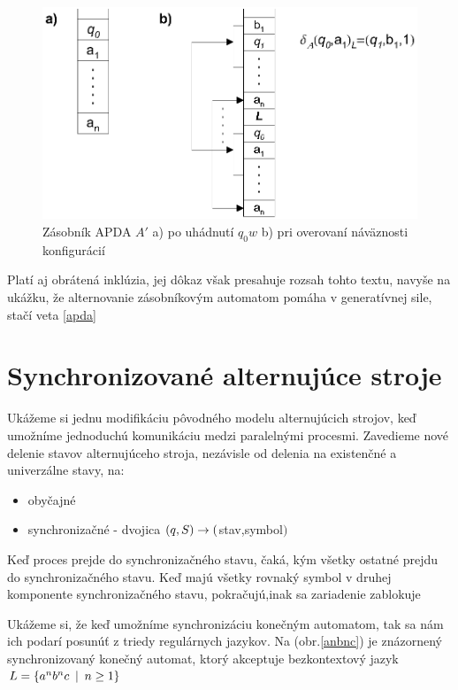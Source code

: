 \begin{figure}[!ht]
  \centering
  \includegraphics{img/zasobnik1}
  \caption{Zásobník APDA $A'$ a) po uhádnutí $q_0w$ b) pri overovaní
  náväznosti konfigurácií} \label{zasobnik1}
\end{figure}

\begin{poznamka}
  Platí aj obrátená inklúzia, jej dôkaz však presahuje rozsah tohto
  textu, navyše na ukážku, že alternovanie zásobníkovým automatom
  pomáha v generatívnej sile, stačí veta \ref{apda}
\end{poznamka}

\section{Synchronizované alternujúce stroje}

Ukážeme si jednu modifikáciu pôvodného modelu alternujúcich strojov,
keď umožníme jed\-no\-du\-chú komunikáciu medzi paralelnými procesmi.
Zavedieme nové delenie stavov alternujúceho
stroja, nezávisle od delenia na existenčné a univerzálne stavy,
na:
\begin{itemize}
  \item obyčajné
  \item synchronizačné - dvojica $(q,S)\rightarrow($stav,symbol$)$
\end{itemize}
Keď proces prejde do synchronizačného stavu, čaká, kým všetky
ostatné prejdu do synchronizačného stavu. Keď majú všetky rovnaký
symbol v druhej komponente synchronizačného stavu, pokračujú,inak
sa zariadenie zablokuje

\begin{priklad}
  Ukážeme si, že keď umožníme synchronizáciu konečným automatom, tak
  sa nám ich podarí posunúť z triedy regulárnych jazykov. Na
  (obr.\ref{anbnc}) je znázornený synchronizovaný konečný automat,
  ktorý akceptuje bezkontextový jazyk $L=\{a^nb^nc\enspace |\enspace n\geq1\}$
\end{priklad}


